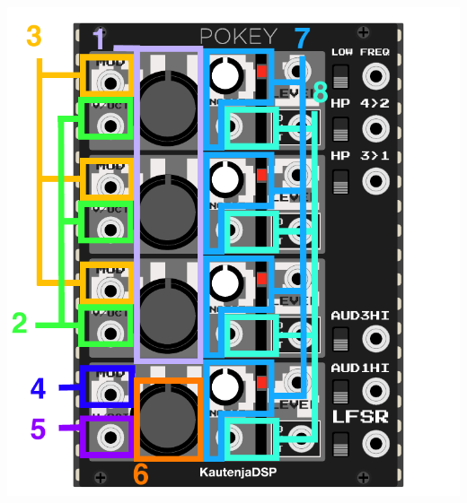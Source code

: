 \documentclass[12pt,a4paper]{article}
\begin{document}
\begin{center}
\includegraphics{POKEY-Manual}
\end{center}



\clearpage
\renewcommand\refname{References \& Acknowledgments}
\nocite{*}


\end{document}
